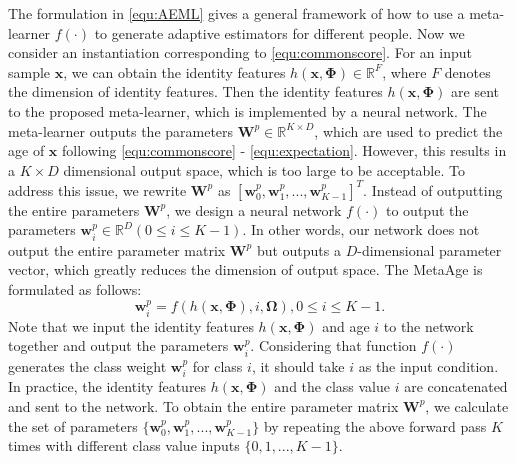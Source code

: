 \documentclass[journal,twoside]{IEEEtran}
\begin{document}
The formulation in \eqref{equ:AEML} gives a general framework of how to use a meta-learner $f(\cdot)$ to generate adaptive estimators for different people. Now we consider an instantiation corresponding to \eqref{equ:commonscore}. For an input sample $\bm{x}$, we can obtain the identity features $h(\bm{x},\bm{\Phi}) \in \mathbb{R}^F$, where $F$ denotes the dimension of identity features. Then the identity features $h(\bm{x},\bm{\Phi})$ are sent to the proposed meta-learner, which is implemented by a neural network. The meta-learner outputs the parameters $\bm{W}^{p}  \in \mathbb{R}^{K \times D}$, which are used to predict the age of $\bm{x}$ following \eqref{equ:commonscore} - \eqref{equ:expectation}. However, this results in a $K \times D$ dimensional output space, which is too large to be acceptable.
To address this issue, we rewrite $\bm{W}^{p}$ as $[\bm{w}_0^{p}, \bm{w}_1^{p}, ..., \bm{w}_{K-1}^{p}]^T$. Instead of outputting the entire parameters $\bm{W}^{p}$, we design a neural network $f(\cdot)$ to output the parameters $\bm{w}_{i}^{p} \in \mathbb{R}^{D} (0 \leq i \leq K-1)$. In other words, our network does not output the entire parameter matrix $\bm{W}^{p}$ but outputs a $D$-dimensional parameter vector, which greatly reduces the dimension of output space. The MetaAge is formulated as follows:
\begin{equation}
\bm{w}_i^{p} = f(h(\bm{x},\bm{\Phi}),i,\bm{\Omega}), 0 \leq i \leq K-1.
\label{equ:smallAEML}
\end{equation}
Note that we input the identity features $h(\bm{x},\bm{\Phi})$ and age $i$ to the network together and output the parameters $\bm{w}_i^{p}$. Considering that function $f(\cdot)$ generates the class weight $\bm{w}_i^{p}$ for class $i$, it should take $i$ as the input condition. In practice, the identity features $h(\bm{x},\bm{\Phi})$ and the class value $i$ are concatenated and sent to the network. To obtain the entire parameter matrix $\bm{W}^{p}$, we calculate the set of parameters $\{ \bm{w}_0^{p}, \bm{w}_1^{p}, ..., \bm{w}_{K-1}^{p} \}$ by repeating the above forward pass $K$ times with different class value inputs $\{0, 1, ..., K-1\}$.
\end{document}
